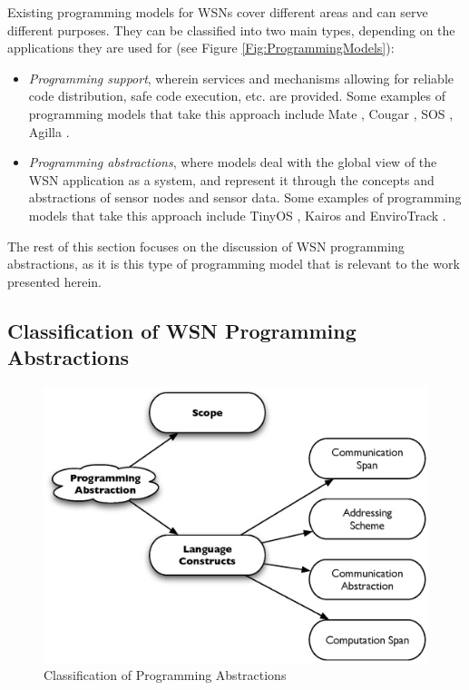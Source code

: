 Existing programming models for WSNs cover different areas and can serve 
different purposes. They can be classified into two main types, depending on 
the applications they are used for  \cite{hadim_middleware:2006} (see Figure
\ref{Fig:ProgrammingModels}):
\begin{itemize}
\item \emph{Programming support}, wherein services and mechanisms allowing for 
reliable code distribution, safe code execution, etc. are provided. Some
examples of programming models that take this approach include Mate
\cite{Levis_Mate:2002}, Cougar \cite{Bonnet_Cougar:2001}, SOS
\cite{Han_SOS:2005}, Agilla \cite{Fok_Agilla:2005}.
\item \emph{Programming abstractions}, where models deal with the global view 
of the WSN application as a system, and represent it through the concepts and 
abstractions of sensor nodes and sensor data. Some
examples of programming models that take this approach include TinyOS
\cite{levis_tinyOS:2005}, Kairos \cite{gummadi_Kairos:2005} and
EnviroTrack \cite{Abdelzaher_EnviroTrack:2004}.
\end{itemize}

The rest of this section focuses on the discussion of WSN programming
abstractions, as it is this type of programming model that is relevant to the
work presented herein.

\subsection{Classification of WSN Programming Abstractions}

\begin{figure}
\centering
\includegraphics[scale=0.65]{img/ProgAbstr_Classification.eps}
\caption{Classification of Programming Abstractions} 
\label{Fig:ProgrAbstrClassification}
\end{figure} 


